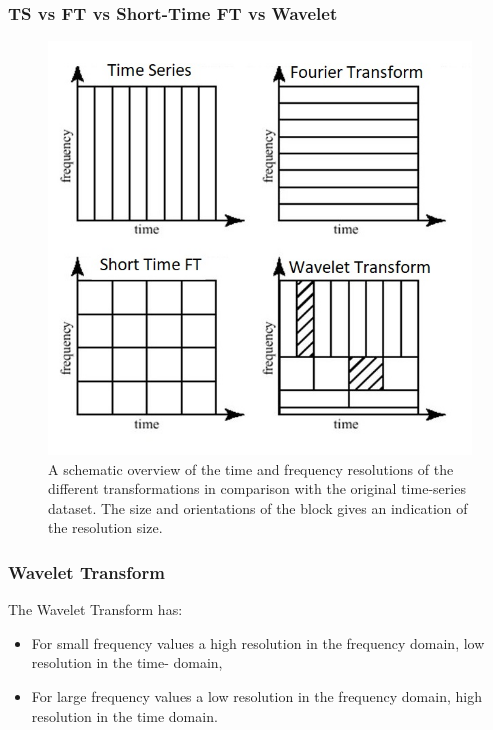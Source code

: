 \documentclass{beamer}
\begin{document}
\begin{frame}
	\frametitle{TS vs FT vs Short-Time FT vs Wavelet}
	\begin{center}
		\begin{figure}
			\includegraphics[scale=0.27]{Comparisonoftransformations.jpg}
			\caption{A schematic overview of the time and frequency resolutions of the different transformations in comparison with the original time-series dataset. The size and orientations of the block gives an indication of the resolution size.}
		\end{figure}
	\end{center}

\end{frame}

\begin{frame}
	\frametitle{Wavelet Transform }
	The Wavelet Transform has:
	
	\begin{itemize}
		\item 
		For small frequency values a high resolution in the frequency domain, low resolution in the time- domain,
		
		\item
		
		For large frequency values a low resolution in the frequency domain, high resolution in the time domain.
		
	\end{itemize}

\end{frame}
\end{document}
